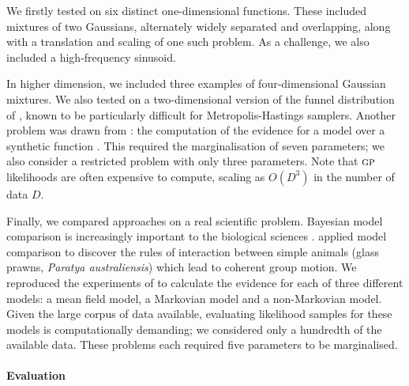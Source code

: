 \documentclass{article}
\begin{document}
We firstly tested on six distinct one-dimensional functions. These included mixtures of two Gaussians, alternately widely separated and overlapping, along with a translation and scaling of one such problem. As a challenge, we also included a high-frequency sinusoid. 

In higher dimension, we included three examples of four-dimensional Gaussian mixtures. We also tested on a two-dimensional version of the funnel distribution of \citet{neal2003slice}, known to be particularly difficult for Metropolis-Hastings samplers. Another problem was drawn from \citet{BZMonteCarlo}: the computation of the evidence for a \gpb model over a synthetic function \citep{friedman1991}. This required the marginalisation of seven parameters; we also consider a restricted problem with only three parameters. Note that $\gpb$ likelihoods are often expensive to compute, scaling as $O(D^3)$ in the number of data $D$.

Finally, we compared approaches on a real scientific problem. Bayesian model comparison is increasingly important to the biological sciences 
\citep{penny2010comparing, rosa2011bayesian}. \citet{mann2012multi} applied model comparison to discover the rules of interaction between simple animals (glass prawns, {\it Paratya australiensis}) which lead to coherent group motion. We reproduced the experiments of \citet{mann2012multi} to calculate the evidence for each of three different models: a mean field model, a Markovian model and a non-Markovian model. Given the large corpus of data available, evaluating likelihood samples for these models is computationally demanding; we considered only a hundredth of the available data. These problems each required five parameters to be marginalised. 


\paragraph{Evaluation}
\end{document}
